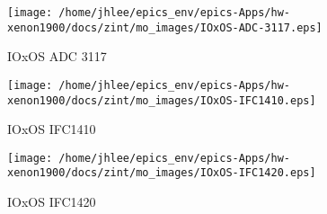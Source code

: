 \noindent
\vspace{1.4cm}
\begin{minipage}{.2\textwidth}
\begin{center}
\texttt{[image: /home/jhlee/epics\_env/epics-Apps/hw-xenon1900/docs/zint/mo\_images/IOxOS-ADC-3117.eps]}
\end{center}
\end{minipage}
\begin{minipage}{.7\textwidth}
IOxOS ADC 3117
\end{minipage}


\noindent
\vspace{1.4cm}
\begin{minipage}{.2\textwidth}
\begin{center}
\texttt{[image: /home/jhlee/epics\_env/epics-Apps/hw-xenon1900/docs/zint/mo\_images/IOxOS-IFC1410.eps]}
\end{center}
\end{minipage}
\begin{minipage}{.7\textwidth}
IOxOS IFC1410
\end{minipage}


\noindent
\vspace{1.4cm}
\begin{minipage}{.2\textwidth}
\begin{center}
\texttt{[image: /home/jhlee/epics\_env/epics-Apps/hw-xenon1900/docs/zint/mo\_images/IOxOS-IFC1420.eps]}
\end{center}
\end{minipage}
\begin{minipage}{.7\textwidth}
IOxOS IFC1420
\end{minipage}


